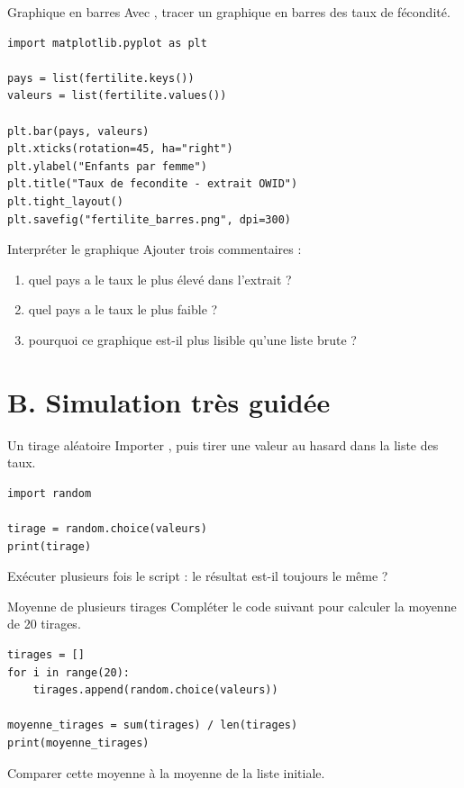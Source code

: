 \documentclass[11pt,a4paper]{article}
\begin{document}
\begin{mandatoryexercise}{Graphique en barres}
Avec , tracer un graphique en barres des taux de fécondité.
\begin{lstlisting}
import matplotlib.pyplot as plt

pays = list(fertilite.keys())
valeurs = list(fertilite.values())

plt.bar(pays, valeurs)
plt.xticks(rotation=45, ha="right")
plt.ylabel("Enfants par femme")
plt.title("Taux de fecondite - extrait OWID")
plt.tight_layout()
plt.savefig("fertilite_barres.png", dpi=300)
\end{lstlisting}
\end{mandatoryexercise}

\begin{mandatoryexercise}{Interpréter le graphique}
Ajouter trois commentaires :
\begin{enumerate}
  \item quel pays a le taux le plus élevé dans l'extrait ?
  \item quel pays a le taux le plus faible ?
  \item pourquoi ce graphique est-il plus lisible qu'une liste brute ?
\end{enumerate}
\end{mandatoryexercise}

\section*{B. Simulation très guidée}

\begin{mandatoryexercise}{Un tirage aléatoire}
Importer , puis tirer une valeur au hasard dans la liste des taux.
\begin{lstlisting}
import random

tirage = random.choice(valeurs)
print(tirage)
\end{lstlisting}
Exécuter plusieurs fois le script : le résultat est-il toujours le même ?
\end{mandatoryexercise}

\begin{mandatoryexercise}{Moyenne de plusieurs tirages}
Compléter le code suivant pour calculer la moyenne de 20 tirages.
\begin{lstlisting}
tirages = []
for i in range(20):
    tirages.append(random.choice(valeurs))

moyenne_tirages = sum(tirages) / len(tirages)
print(moyenne_tirages)
\end{lstlisting}
Comparer cette moyenne à la moyenne de la liste initiale.
\end{mandatoryexercise}
\end{document}
